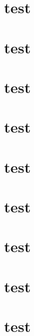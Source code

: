 \documentclass[type = doctor]{CCNUthesis}
\begin{document}
\chapter{test}
\chapter{test}
\chapter{test}
\chapter{test}
\chapter{test}
\chapter{test}
\chapter{test}
\chapter{test}
\chapter{test}


\backmatter



\printbibliography




% 





% 
\end{document}
